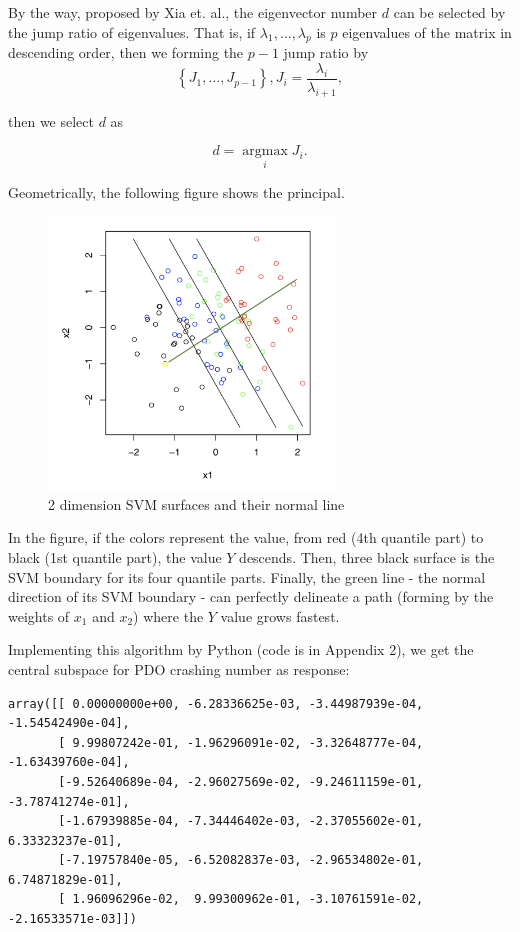 \documentclass[11pt]{scrartcl} %
\begin{document}
By the way, proposed by Xia et. al.\cite{xia2015consistently}, the eigenvector number $d$ can be selected by the jump ratio of eigenvalues. That is, if ${\lambda _1}, \ldots ,{\lambda _p}$ is $p$ eigenvalues of the matrix in descending order, then we forming the $p-1$ jump ratio by
\begin{equation*}
\left\{ {{J_1}, \ldots ,{J_{p - 1}}} \right\},{J_i} = \frac{{{\lambda _i}}}{{{\lambda _{i + 1}}}},
\end{equation*}

then we select $d$ as

\begin{equation*}
d = \mathop {\arg \max }\limits_i {J_i}.
\end{equation*}



Geometrically, the following figure shows the principal. 

\begin{figure}[H]
\centering
\includegraphics[width=3in]{image/psvm.png}
\small
\caption{2 dimension SVM surfaces and their normal line}
\end{figure}

In the figure, if the colors represent the value, from red (4th quantile part) to black (1st quantile part), the value $Y$ descends. Then, three black surface is the SVM boundary for its four quantile parts. Finally, the green line - the normal direction of its SVM boundary - can perfectly delineate a path (forming by the weights of $x_1$ and $x_2$) where the $Y$ value grows fastest.

\par

Implementing this algorithm by Python (code is in Appendix 2), we get the central subspace for PDO crashing number as response:

\begin{lstlisting}
array([[ 0.00000000e+00, -6.28336625e-03, -3.44987939e-04, -1.54542490e-04],
       [ 9.99807242e-01, -1.96296091e-02, -3.32648777e-04, -1.63439760e-04],
       [-9.52640689e-04, -2.96027569e-02, -9.24611159e-01, -3.78741274e-01],
       [-1.67939885e-04, -7.34446402e-03, -2.37055602e-01, 6.33323237e-01],
       [-7.19757840e-05, -6.52082837e-03, -2.96534802e-01, 6.74871829e-01],
       [ 1.96096296e-02,  9.99300962e-01, -3.10761591e-02, -2.16533571e-03]])
\end{lstlisting}
\end{document}
